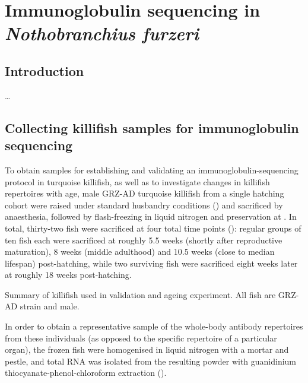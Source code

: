 
\chapter{Immunoglobulin sequencing in \textit{Nothobranchius furzeri}} 
\label{chap:igseq} 
\onehalfspacing
\pagebreak

\section{Introduction}
\label{sec:igseq_intro}

\dots

\section{Collecting killifish samples for immunoglobulin sequencing}
\label{sec:igseq_samples}

To obtain samples for establishing and validating an immunoglobulin-sequencing protocol in turquoise killifish, as well as to investigate changes in killifish repertoires with age, male GRZ-AD turquoise killifish from a single hatching cohort were raised under standard husbandry conditions () and sacrificed by anaesthesia, followed by flash-freezing in liquid nitrogen and preservation at . In total, thirty-two fish were sacrificed at four total time points (): regular groups of ten fish each were sacrificed at roughly 5.5 weeks (shortly after reproductive maturation), 8 weeks (middle adulthood) and 10.5 weeks (close to median lifespan) post-hatching, while two surviving fish were sacrificed eight weeks later at roughly 18 weeks post-hatching.

\begin{table}
\caption{Summary of killifish used in \igseq validation and ageing experiment. All fish are GRZ-AD strain and male.}
\label{tab:igseq-cohorts-summary}

\end{table}

In order to obtain a representative sample of the whole-body antibody repertoires from these individuals (as opposed to the specific repertoire of a particular organ), the frozen fish were homogenised in liquid nitrogen with a mortar and pestle, and total RNA was isolated from the resulting powder with guanidinium thiocyanate-phenol-chloroform extraction ().

